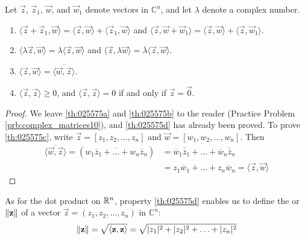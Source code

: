\documentclass{ximera}
\begin{document}
\begin{theorem}\label{th:025575}
Let $\vec{z}$, $\vec{z}_{1}$, $\vec{w}$, and $\vec{w}_{1}$ denote vectors in $\mathbb{C}^n$, and let $\lambda$ denote a complex number.
\begin{enumerate}
\item\label{th:025575a} $\langle \vec{z} + \vec{z}_{1}, \vec{w}\rangle = \langle \vec{z}, \vec{w} \rangle + \langle \vec{z}_{1}, \vec{w} \rangle$ \quad and \quad
$\langle \vec{z}, \vec{w} + \vec{w}_{1} \rangle = \langle \vec{z}, \vec{w} \rangle + \langle \vec{z}, \vec{w}_{1} \rangle$.

\item\label{th:025575b} $\langle \lambda \vec{z}, \vec{w} \rangle = \lambda \langle \vec{z}, \vec{w} \rangle$ \quad and \quad $\langle \vec{z}, \lambda \vec{w} \rangle = \overline{\lambda} \langle \vec{z}, \vec{w} \rangle$.

\item\label{th:025575c} $\langle \vec{z}, \vec{w} \rangle = \overline{\langle \vec{w}, \vec{z} \rangle}$.

\item\label{th:025575d} $\langle \vec{z}, \vec{z} \rangle \ge 0$, \quad and \quad $\langle \vec{z}, \vec{z} \rangle = 0$ if and only if $\vec{z} = \vec{0}$.

\end{enumerate}
\end{theorem}

\begin{proof}
We leave \ref{th:025575a} and \ref{th:025575b} to the reader (Practice Problem \ref{prb:complex_matrices10}), and \ref{th:025575d} has already been proved. To prove \ref{th:025575c}, write $\vec{z} = [z_{1}, z_{2}, \ldots, z_{n}]$ and $\vec{w} = [w_{1}, w_{2}, \ldots, w_{n}]$. Then
\begin{align*}
\overline{\langle \vec{w}, \vec{z} \rangle} = (\overline{w_{1}\overline{z}_{1} + \ldots + w_{n}\overline{z}_{n}}) &= \overline{w}_{1}\overline{\overline{z}}_{1} + \ldots + \overline{w}_{n}\overline{\overline{z}}_{n} \\
&= z_{1}\overline{w}_{1} + \ldots + z_{n}\overline{w}_{n} = \langle \vec{z}, \vec{w} \rangle
\end{align*}
\end{proof}

\begin{definition}\label{def:025606}
As for the dot product on $\mathbb{R}^n$, property \ref{th:025575d} enables us to define the  or  $\left\lVert\mathbf{z}\right\rVert$ of a vector $\vec{z} = (z_{1}, z_{2}, \ldots, z_{n})$ in $\mathbb{C}^n$:
\begin{equation*}
\left\lVert\mathbf{z}\right\rVert = \sqrt{\langle \mathbf{z}, \mathbf{z} \rangle} = \sqrt{|z_{1}|^2 + |z_{2}|^2 + \ldots + |z_{n}|^2}
\end{equation*}
\end{definition}
\end{document}
